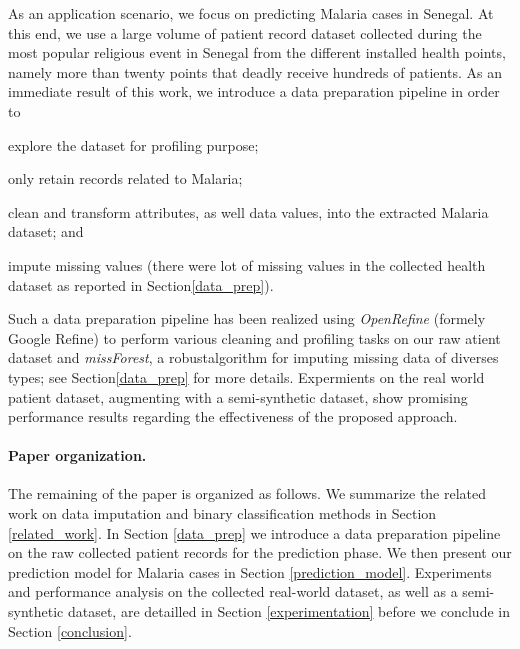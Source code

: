 As an application scenario, we focus on predicting Malaria cases in Senegal. At this end, we use  a large volume of patient record dataset collected during the most popular religious event in Senegal from the different installed health points, namely more than twenty points that deadly receive hundreds of patients.
As an immediate result of this work, we introduce a data preparation pipeline in order to 
\begin{inparaenum}[(i)]
\item explore the dataset for profiling purpose;
\item only retain records related to Malaria;
\item clean and transform attributes, as well data values, into the extracted Malaria dataset; and 
\item impute missing values (there were lot of missing values in the collected health dataset as reported in Section\ref{data_prep}).
\end{inparaenum}
Such a data preparation pipeline has been realized using \emph{OpenRefine} (formely Google Refine) to perform various cleaning and profiling tasks on our raw atient dataset and \emph{missForest}, a robustalgorithm for imputing  missing data of diverses types; see Section\ref{data_prep} for more details. 
Expermients on the real world patient dataset, augmenting with a semi-synthetic dataset, show promising performance results regarding the effectiveness of the proposed approach.

\paragraph*{Paper organization.}The remaining of the paper is organized as follows. We summarize the related work on data imputation and binary classification methods in Section \ref{related_work}.
In Section \ref{data_prep} we introduce a data preparation pipeline on the raw collected patient records for the prediction phase. 
We then present our prediction model for Malaria cases in Section \ref{prediction_model}.
Experiments and performance analysis  on the collected real-world dataset, as well as a semi-synthetic dataset,  are detailled in Section \ref{experimentation} before we conclude in Section \ref{conclusion}. 
